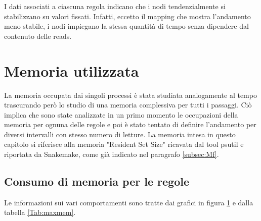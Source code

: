 I dati associati a ciascuna regola indicano che i nodi tendenzialmente si stabilizzano su valori fissati.
Infatti, eccetto il mapping che mostra l'andamento meno stabile, i nodi impiegano la stessa quantità di tempo senza dipendere dal contenuto delle reads. 


\section{Memoria utilizzata}
La memoria occupata dai singoli processi è stata studiata analogamente al tempo trascurando però lo studio di una memoria complessiva per tutti i passaggi. 
Ciò implica che sono state analizzate in un primo momento le occupazioni della memoria per ognuna delle regole e poi è stato tentato di definire l'andamento per diversi intervalli con stesso numero di letture.
La memoria intesa in questo capitolo si riferisce alla memoria "Resident Set Size" ricavata dal tool psutil e riportata da Snakemake, come già indicato nel paragrafo \ref{subsec:Mf}. 

\subsection{Consumo di memoria per le regole}
Le informazioni sui vari comportamenti sono tratte dai grafici in figura \ref{fig:RSSr} e dalla tabella \ref{Tab:maxmem}.
\begin{figure}[H]
\centering
{} \quad
{} \\
\end{figure}
\begin{figure}[H]
\ContinuedFloat
\centering
{} \quad
{} \\
\end{figure}
\begin{figure}[H]
\ContinuedFloat
\centering
{} 
\caption{}
\label{fig:RSSr}
\end{figure}

